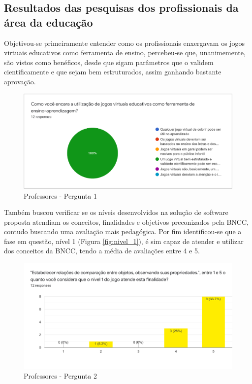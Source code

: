 \documentclass[article,12pt,openany,oneside,a4paper,english,brazil]{abntex2}
\begin{document}
\subsection{Resultados das pesquisas dos profissionais da área da educação}
\label{sc:resultados_pesquisa_professores}

Objetivou-se primeiramente entender como os profissionais enxergavam os jogos virtuais educativos como ferramenta de ensino, percebeu-se que, unanimemente, são vistos como benéficos, desde que sigam parâmetros que o validem cientificamente e que sejam bem estruturados, assim ganhando bastante aprovação.

\begin{figure}[H]
    \centering
    \caption{Professores - Pergunta 1}
    \label{fig:professor_pergunta_1}
    \includegraphics[width=0.8\linewidth]{SearchResults/Teachers/GamesUtilization.png}
\end{figure}

Também buscou verificar se os níveis desenvolvidos na solução de software proposta atendiam os conceitos, finalidades e objetivos preconizados pela BNCC, contudo buscando uma avaliação mais pedagógica. Por fim identificou-se que a fase em questão, nível 1 (Figura \ref{fig:nivel_1}), é sim capaz de atender e utilizar dos conceitos da BNCC, tendo a média de avaliações entre 4 e 5.

\begin{figure}[H]
    \centering
    \caption{Professores - Pergunta 2}
    \label{fig:professor_pergunta_2}
    \includegraphics[width=0.8\linewidth]{SearchResults/Teachers/Level1.png}
\end{figure}
\end{document}
